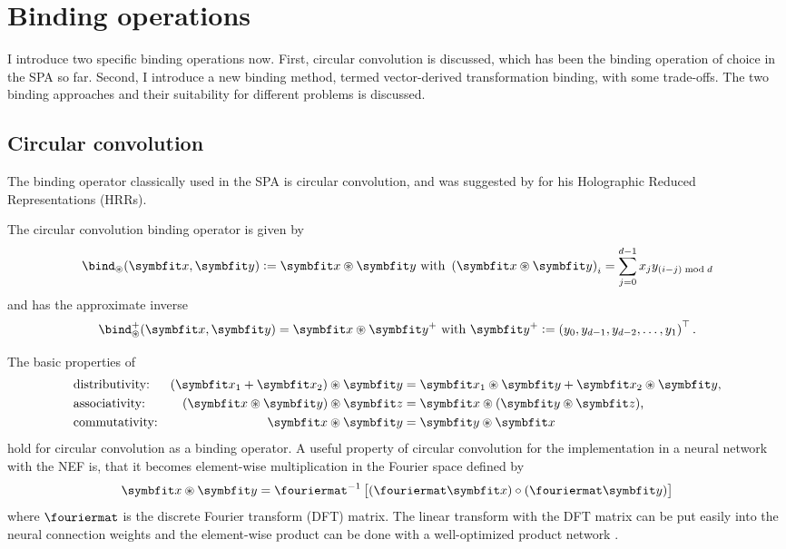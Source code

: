\section{Binding operations}
I introduce two specific binding operations now.
First, circular convolution is discussed, which has been the binding operation of choice in the SPA so far.
Second, I introduce a new binding method, termed vector-derived transformation binding, with some trade-offs.
The two binding approaches and their suitability for different problems is discussed.

\subsection{Circular convolution}
The binding operator classically used in the SPA is circular convolution, and was suggested by \textcite{plate1995,plate2003} for his Holographic Reduced Representations (HRRs).
\begin{defn}
    The circular convolution binding operator is given by
    \begin{equation}
        \bind_{\circledast}(\vc x, \vc y) := \vc x \circledast \vc y\ \text{with}\ \del{\vc x \circledast \vc y}_i = \sum_{j=0}^{d - 1} x_j y_{(i - j) \bmod d}
    \end{equation}
    and has the approximate inverse \parencite{plate2003}
    \begin{equation}
        \bind^+_{\circledast}(\vc x, \vc y) = \vc x \circledast \vc y^+\ \text{with}\ \vc y^+ := \del{y_0, y_{d-1}, y_{d-2}, \dotsc, y_1}\Tr \text{.}
    \end{equation}
\end{defn}

The basic properties of
\begin{align}
    &\text{distributivity:} &(\vc x_1 + \vc x_2) \circledast \vc y &= \vc x_1 \circledast \vc y + \vc x_2 \circledast \vc y \text{,}\\
    &\text{associativity:} &(\vc x \circledast \vc y) \circledast \vc z &= \vc x \circledast (\vc y \circledast \vc z) \text{,} \\
    &\text{commutativity:} &\vc x \circledast \vc y &= \vc y \circledast \vc x
\end{align}
hold for circular convolution as a binding operator.
A useful property of circular convolution for the implementation in a neural network with the NEF is, that it becomes element-wise multiplication in the Fourier space defined by
\begin{equation}
    \vc x \circledast \vc y = \fouriermat^{-1}\sbr{(\fouriermat \vc x) \circ (\fouriermat \vc y)}
\end{equation}
where $\fouriermat$ is the discrete Fourier transform (DFT) matrix.
The linear transform with the DFT matrix can be put easily into the neural connection weights and the element-wise product can be done with a well-optimized product network \parencite{gosmann2015-1}.

